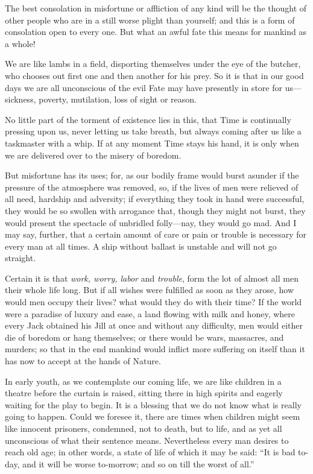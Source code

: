 The best consolation in misfortune or affliction of any kind will be
the thought of other people who are in a still worse plight than
yourself; and this is a form of consolation open to every one. But
what an awful fate this means for mankind as a whole!

We are like lambs in a field, disporting themselves under the eye of
the butcher, who chooses out first one and then another for his prey.
So it is that in our good days we are all unconscious of the evil Fate
may have presently in store for us---sickness, poverty, mutilation,
loss of sight or reason.

No little part of the torment of existence lies in this, that Time is
continually pressing upon us, never letting us take breath, but always
coming after us like a taskmaster with a whip. If at any moment Time
stays his hand, it is only when we are delivered over to the misery of
boredom.

But misfortune has its uses; for, as our bodily frame would burst
asunder if the pressure of the atmosphere was removed, so, if the
lives of men were relieved of all need, hardship and adversity; if
everything they took in hand were successful, they would be so swollen
with arrogance that, though they might not burst, they would present
the spectacle of  unbridled folly---nay, they would go mad.
And I may say, further, that a certain amount of care or pain or
trouble is necessary for every man at all times. A ship without
ballast is unstable and will not go straight.

Certain it is that \textit{work, worry, labor} and \textit{trouble},
form the lot of almost all men their whole life long. But if all
wishes were fulfilled as soon as they arose, how would men occupy
their lives? what would they do with their time? If the world were a
paradise of luxury and ease, a land flowing with milk and honey, where
every Jack obtained his Jill at once and without any difficulty, men
would either die of boredom or hang themselves; or there would be
wars, massacres, and murders; so that in the end mankind would inflict
more suffering on itself than it has now to accept at the hands of
Nature.

In early youth, as we contemplate our coming life, we are like
children in a theatre before the curtain is raised, sitting there in
high spirits and eagerly waiting for the play to begin. It is a
blessing that we do not know what is really going to happen. Could we
foresee it, there are times when children might seem like innocent
prisoners, condemned, not to death, but to life, and as yet all
unconscious of what their sentence means. Nevertheless every man
desires to reach old age; in other words, a state of life of which it
may be said: ``It is bad to-day, and it will be worse to-morrow; and
so on till the worst of all.''

